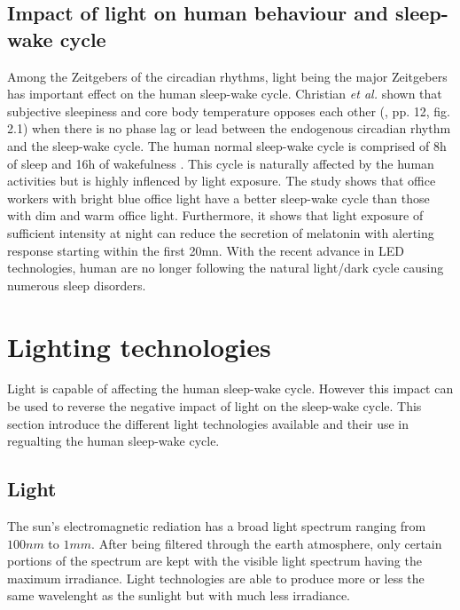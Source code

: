 \subsection{Impact of light on human behaviour and sleep-wake cycle}
Among the Zeitgebers of the circadian rhythms, light being the major Zeitgebers has important effect on the human sleep-wake cycle. Christian \textit{et al.}\cite{cir2014} shown that subjective sleepiness and core body temperature opposes each other (\cite{cir2014}, pp. 12, fig. 2.1) when there is no phase lag or lead between the endogenous circadian rhythm and the sleep-wake cycle. The human normal sleep-wake cycle is comprised of 8h of sleep and 16h of wakefulness \cite{is1995}. This cycle is naturally affected by the human activities but is highly inflenced by light exposure. The study shows that office workers with bright blue office light have a better sleep-wake cycle than those with dim and warm office light. Furthermore, it shows that light exposure of sufficient intensity at night can reduce the secretion of melatonin with alerting response starting within the first 20mn. With the recent advance in LED technologies, human are no longer following the natural light/dark cycle causing numerous sleep disorders. 

  
\section{Lighting technologies}

Light is capable of affecting the human sleep-wake cycle. However this impact can be used to reverse the negative impact of light on the sleep-wake cycle. This section introduce the different light technologies available and their use in regualting the human sleep-wake cycle. 

\subsection{Light}
The sun's electromagnetic rediation has a broad light spectrum ranging from  $100nm$ to $1mm$. After being filtered through the earth atmosphere, only certain portions of the spectrum are kept with the visible light spectrum having the maximum irradiance. Light technologies are able to produce more or less the same wavelenght as the sunlight but with much less irradiance.


